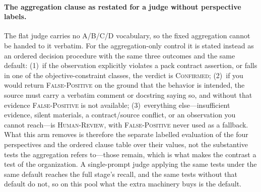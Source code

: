 \documentclass[acmsmall,screen,review,anonymous]{acmart}
\begin{document}
\paragraph{The aggregation clause as restated for a judge without perspective labels.} The flat judge carries no A/B/C/D vocabulary, so the fixed aggregation cannot be handed to it verbatim. For the aggregation-only control it is stated instead as an ordered decision procedure with the same three outcomes and the same default: (1)~if the observation explicitly violates a pack contract assertion, or falls in one of the objective-constraint classes, the verdict is \textsc{Confirmed}; (2)~if you would return \textsc{False-Positive} on the ground that the behavior is intended, the source must carry a verbatim comment or docstring saying so, and without that evidence \textsc{False-Positive} is not available; (3)~everything else---insufficient evidence, silent materials, a contract/source conflict, or an observation you cannot reach---is \textsc{Human-Review}, with \textsc{False-Positive} never used as a fallback. What this arm removes is therefore the separate labelled evaluation of the four perspectives and the ordered clause table over their values, not the substantive tests the aggregation refers to---those remain, which is what makes the contrast a test of the organization. A single-prompt judge applying the same tests under the same default reaches the full stage's recall, and the same tests without that default do not, so on this pool what the extra machinery buys is the default.
\end{document}
